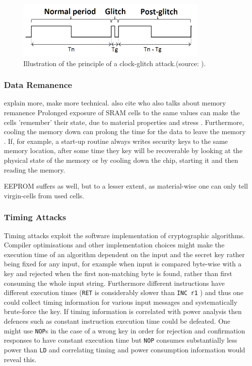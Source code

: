	\begin{figure}
		\center
		\includegraphics[scale=0.7]{img/clock_glitch.png}
		\caption{\footnotesize Illustration of the principle of a clock-glitch attack.(source: \protect\citep{glitches_paper}).}
		\label{fig:glitch}		
	\end{figure}

	\subsubsection{Data Remanence}
	{\color{red} explain more, make more technical. also cite \citep{website:ibm_secure} who also talks about memory remanence}
	Prolonged exposure of SRAM cells to the same values can make the cells 'remember' their state, due to material properties and stress \citep{gutman:memory_remanence}. Furthermore, cooling the memory down can prolong the time for the data to leave the memory \citep{gutman:memory_remanence} \citep{sergei:RAM} \citep{sergei:thesis}. If, for example, a start-up routine always writes security keys to the same memory location, after some time they key will be recoverable by looking at the physical state of the memory or by cooling down the chip, starting it and then reading the memory.
	
	EEPROM suffers as well, but to a lesser extent, as material-wise one can only tell virgin-cells from used cells\citep{sergei:thesis}. 
	
	\subsubsection{Timing Attacks}
	Timing attacks exploit the software implementation of cryptographic algorithms. Compiler optimisations and other implementation choices might make the execution time of an algorithm dependent on the input and the secret key rather being fixed for any input, for example when input is compared byte-wise with a key and rejected when the first non-matching byte is found, rather than first consuming the whole input string. Furthermore different instructions have different execution times (\texttt{RET} is considerably slower than \texttt{INC r1} \citep{atmega_manual}) and thus one could collect timing information for various input messages and systematically brute-force the key. If timing information is correlated with power analysis then defences such as constant instruction execution time could be defeated. One might use \texttt{NOP}s in the case of a wrong key in order for rejection and confirmation responses to have constant execution time but \texttt{NOP} consumes substantially less power than \texttt{LD} \citep{glitches_paper} and correlating timing and power consumption information would reveal this.

